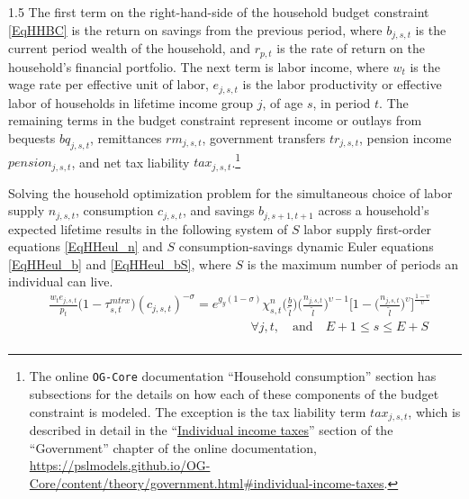 \documentclass[letterpaper,12pt]{article}
\theoremstyle{definition}
\begin{document}
\begin{spacing}{1.5}
    The first term on the right-hand-side of the household budget constraint \eqref{EqHHBC} is the return on savings from the previous period, where $b_{j,s,t}$ is the current period wealth of the household, and $r_{p,t}$ is the rate of return on the household's financial portfolio. The next term is labor income, where $w_t$ is the wage rate per effective unit of labor, $e_{j,s,t}$ is the labor productivity or effective labor of households in lifetime income group $j$, of age $s$, in period $t$. The remaining terms in the budget constraint represent income or outlays from bequests $bq_{j,s,t}$, remittances $rm_{j,s,t}$, government transfers $tr_{j,s,t}$, pension income $pension_{j,s,t}$, and net tax liability $tax_{j,s,t}$.\footnote{The online \texttt{OG-Core} documentation ``Household consumption'' section has subsections for the details on how each of these components of the budget constraint is modeled. The exception is the tax liability term $tax_{j,s,t}$, which is described in detail in the ``\href{https://pslmodels.github.io/OG-Core/content/theory/government.html\#individual-income-taxes}{Individual income taxes}'' section of the ``Government'' chapter of the online documentation, \href{https://pslmodels.github.io/OG-Core/content/theory/government.html\#individual-income-taxes}{https://pslmodels.github.io/OG-Core/content/theory/government.html\#individual-income-taxes}.}

    Solving the household optimization problem for the simultaneous choice of labor supply $n_{j,s,t}$, consumption $c_{j,s,t}$, and savings $b_{j,s+1,t+1}$ across a household's expected lifetime results in the following system of $S$ labor supply first-order equations \eqref{EqHHeul_n} and $S$ consumption-savings dynamic Euler equations \eqref{EqHHeul_b} and \eqref{EqHHeul_bS}, where $S$ is the maximum number of periods an individual can live.
    \begin{equation}\label{EqHHeul_n}
      \begin{split}
        &\frac{w_t e_{j,s,t}}{p_t}\bigl(1 - \tau^{mtrx}_{s,t}\bigr)(c_{j,s,t})^{-\sigma} = e^{g_y(1-\sigma)}\chi^n_{s,t}\biggl(\frac{b}{\tilde{l}}\biggr)\biggl(\frac{n_{j,s,t}}{\tilde{l}}\biggr)^{\upsilon-1}\Biggl[1 - \biggl(\frac{n_{j,s,t}}{\tilde{l}}\biggr)^\upsilon\Biggr]^{\frac{1-\upsilon}{\upsilon}} \\
        &\qquad\qquad\qquad\qquad\qquad\qquad\qquad\qquad\forall j,t, \quad\text{and}\quad E+1\leq s\leq E+S \\
      \end{split}
    \end{equation}


\end{spacing}
\end{document}
